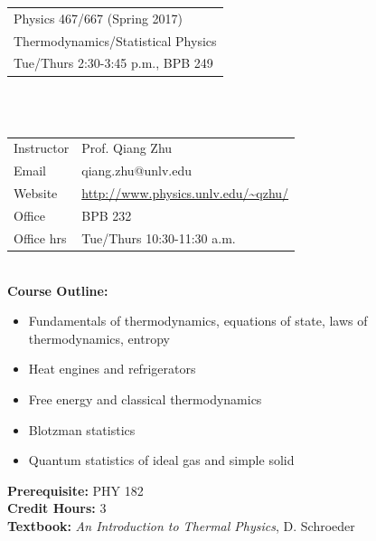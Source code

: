 \documentclass[11pt]{article}
\begin{document}
\begin{tabular}{ l }
  \LARGE Physics 467/667 (Spring 2017)\\
  \LARGE Thermodynamics/Statistical Physics \\
  \LARGE Tue/Thurs 2:30-3:45 p.m., BPB 249 \\
\end{tabular}\\\\

\begin{tabular}{ l l }
  \large Instructor &\large Prof. Qiang Zhu \\
  \large Email      &\large qiang.zhu@unlv.edu \\
  \large Website    &\large \url{http://www.physics.unlv.edu/~qzhu/} \\
  \large Office     &\large BPB 232 \\
  \large Office hrs &\large Tue/Thurs 10:30-11:30 a.m. \\
\end{tabular}\\

\textbf {\large Course Outline:}
\begin{itemize} 
\item Fundamentals of thermodynamics, equations of state, laws of thermodynamics, entropy
\item Heat engines and refrigerators
\item Free energy and classical thermodynamics
\item Blotzman statistics
\item Quantum statistics of ideal gas and simple solid\\
\end{itemize}

\textbf {Prerequisite:} PHY 182\\
\textbf {Credit Hours:} 3 \\
\textbf {\large Textbook:} \emph{An Introduction to Thermal Physics}, D. Schroeder\\\\
\end{document}
